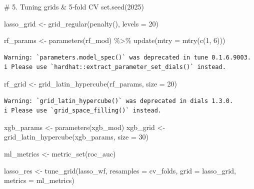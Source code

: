 \documentclass[
  letterpaper,
  DIV=11,
  numbers=noendperiod]{scrartcl}
\newenvironment{Shaded}{}{}
\newcommand{\AttributeTok}[1]{\textcolor[rgb]{0.84,0.23,0.29}{#1}}
\newcommand{\CommentTok}[1]{\textcolor[rgb]{0.42,0.45,0.49}{#1}}
\newcommand{\DecValTok}[1]{\textcolor[rgb]{0.00,0.36,0.77}{#1}}
\newcommand{\FunctionTok}[1]{\textcolor[rgb]{0.44,0.26,0.76}{#1}}
\newcommand{\NormalTok}[1]{\textcolor[rgb]{0.14,0.16,0.18}{#1}}
\newcommand{\OtherTok}[1]{\textcolor[rgb]{0.44,0.26,0.76}{#1}}
\newcommand{\SpecialCharTok}[1]{\textcolor[rgb]{0.00,0.36,0.77}{#1}}
\begin{document}
\begin{Shaded}
\begin{Highlighting}[]
\CommentTok{\# 5. Tuning grids \& 5‐fold CV}
\FunctionTok{set.seed}\NormalTok{(}\DecValTok{2025}\NormalTok{)}

\NormalTok{lasso\_grid }\OtherTok{\textless{}{-}} \FunctionTok{grid\_regular}\NormalTok{(}\FunctionTok{penalty}\NormalTok{(), }\AttributeTok{levels =} \DecValTok{20}\NormalTok{)}

\NormalTok{rf\_params }\OtherTok{\textless{}{-}} \FunctionTok{parameters}\NormalTok{(rf\_mod) }\SpecialCharTok{\%\textgreater{}\%}
  \FunctionTok{update}\NormalTok{(}\AttributeTok{mtry =} \FunctionTok{mtry}\NormalTok{(}\FunctionTok{c}\NormalTok{(}\DecValTok{1}\NormalTok{, }\DecValTok{6}\NormalTok{)))}
\end{Highlighting}
\end{Shaded}

\begin{verbatim}
Warning: `parameters.model_spec()` was deprecated in tune 0.1.6.9003.
i Please use `hardhat::extract_parameter_set_dials()` instead.
\end{verbatim}

\begin{Shaded}
\begin{Highlighting}[]
\NormalTok{rf\_grid   }\OtherTok{\textless{}{-}} \FunctionTok{grid\_latin\_hypercube}\NormalTok{(rf\_params, }\AttributeTok{size =} \DecValTok{20}\NormalTok{)}
\end{Highlighting}
\end{Shaded}

\begin{verbatim}
Warning: `grid_latin_hypercube()` was deprecated in dials 1.3.0.
i Please use `grid_space_filling()` instead.
\end{verbatim}

\begin{Shaded}
\begin{Highlighting}[]
\NormalTok{xgb\_params }\OtherTok{\textless{}{-}} \FunctionTok{parameters}\NormalTok{(xgb\_mod)}
\NormalTok{xgb\_grid   }\OtherTok{\textless{}{-}} \FunctionTok{grid\_latin\_hypercube}\NormalTok{(xgb\_params, }\AttributeTok{size =} \DecValTok{30}\NormalTok{)}

\NormalTok{ml\_metrics }\OtherTok{\textless{}{-}} \FunctionTok{metric\_set}\NormalTok{(roc\_auc)}

\NormalTok{lasso\_res }\OtherTok{\textless{}{-}} \FunctionTok{tune\_grid}\NormalTok{(lasso\_wf, }\AttributeTok{resamples =}\NormalTok{ cv\_folds,}
                       \AttributeTok{grid =}\NormalTok{ lasso\_grid, }\AttributeTok{metrics =}\NormalTok{ ml\_metrics)}
\end{Highlighting}
\end{Shaded}
\end{document}
